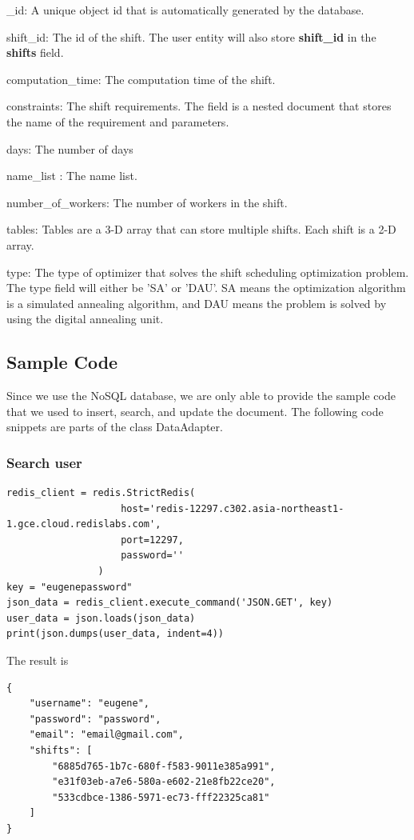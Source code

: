 \documentclass[11pt, oneside]{article}   	%
\begin{document}
\begin{compactenum}[1.]
\item \_id: A unique object id that is automatically generated by the database.
\item shift\_id: The id of the shift. The user entity will also store \textbf{shift\_id} in the \textbf{shifts} field.
\item computation\_time: The computation time of the shift.
\item constraints: The shift requirements. The field is a nested document that stores the name of the requirement and parameters.
\item days: The number of days
\item name\_list : The name list.
\item number\_of\_workers: The number of workers in the shift.
\item tables: Tables are a 3-D array that can store multiple shifts. Each shift is a 2-D array.
\item type: The type of optimizer that solves the shift scheduling optimization problem. The type field will either be 'SA' or 'DAU'. SA means the optimization algorithm is a simulated annealing algorithm, and DAU means the problem is solved by using the digital annealing unit.
\end{compactenum}

\subsection{Sample Code}

Since we use the NoSQL database, we are only able to provide the sample code that we used to insert, search, and update the document.
The following code snippets are parts of the class DataAdapter.

\subsubsection{Search user}
\begin{verbatim}
redis_client = redis.StrictRedis(
                    host='redis-12297.c302.asia-northeast1-1.gce.cloud.redislabs.com',
                    port=12297,
                    password=''
                )
key = "eugenepassword"
json_data = redis_client.execute_command('JSON.GET', key)
user_data = json.loads(json_data)
print(json.dumps(user_data, indent=4))
\end{verbatim}

The result is
\begin{verbatim}
{
    "username": "eugene",
    "password": "password",
    "email": "email@gmail.com",
    "shifts": [
        "6885d765-1b7c-680f-f583-9011e385a991",
        "e31f03eb-a7e6-580a-e602-21e8fb22ce20",
        "533cdbce-1386-5971-ec73-fff22325ca81"
    ]
}
\end{verbatim}
\end{document}
